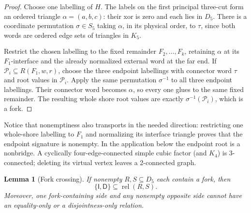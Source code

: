 \documentclass[11pt]{article}
\newtheorem{lemma}[theorem]{Lemma}
\theoremstyle{definition}
\theoremstyle{remark}
\begin{document}
\begin{proof}
Choose one labelling of \(H\).  The labels on the first principal
three-cut form an ordered triangle
\(\alpha=(a,b,c)\): their xor is zero and each lies in \(D_5\).
There is a coordinate permutation \(\sigma\in S_5\) taking \(\alpha\),
in its physical order, to \(\tau\), since both words are ordered edge
sets of triangles in \(K_5\).

Restrict the chosen labelling to the fixed remainder
\(F_2,\ldots,F_k\), retaining \(\alpha\) at its \(F_1\)-interface and
the already normalized external word at the far end.  If
\(\mathcal P_i\subseteq R(F_1,w,r)\), choose the three endpoint
labellings with connector word \(\tau\) and root values in
\(\mathcal P_i\).  Apply the same permutation \(\sigma^{-1}\) to all
three endpoint labellings.  Their connector word becomes \(\alpha\),
so every one glues to the same fixed remainder.  The resulting whole
shore root values are exactly
\(\sigma^{-1}(\mathcal P_i)\), which is a fork.
\end{proof}

Notice that nonemptiness also transports in the needed direction:
restricting one whole-shore labelling to \(F_1\) and normalizing its
interface triangle proves that the endpoint signature is nonempty.
In the application below the endpoint root is a nonbridge.  A
cyclically four-edge-connected simple cubic factor (and \(K_4\)) is
3-connected; deleting its virtual vertex leaves a 2-connected graph.

\begin{lemma}[Fork crossing]\label{lem:fork-crossing}
If nonempty \(R,S\subseteq D_5\) each contain a fork, then
\[
              \{\mathsf I,\mathsf D\}
                 \subseteq\operatorname{rel}(R,S).              \tag{6.18}
\label{eq:fork-crossing}
\]
Moreover, one fork-containing side and any nonempty opposite side
cannot have an equality-only or a disjointness-only relation.
\end{lemma}
\end{document}

